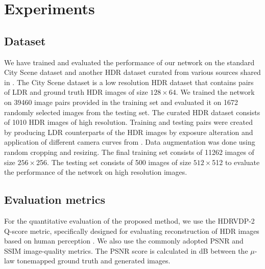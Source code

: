 \documentclass[conference]{IEEEtran}
\begin{document}
\section{Experiments}

\subsection{Dataset}

We have trained and evaluated the performance of our network on the standard City Scene dataset \cite{zhang2017learning} and another HDR dataset curated from various sources shared in \cite{eilertsen2017hdr}.
The City Scene dataset is a low resolution HDR dataset that contains pairs of LDR and ground truth HDR images of size $128 \times 64$. We trained the network on 39460 image pairs provided in the training set and evaluated it on 1672 randomly selected images from the testing set. The curated HDR dataset consists of 1010 HDR images of high resolution.
Training and testing pairs were created by producing LDR counterparts of the HDR images by exposure alteration and application of different camera curves from \cite{1211522}. Data augmentation was done using random cropping and resizing. The final training set consists of 11262 images of size $256 \times $256. The testing set consists of 500 images of size $512 \times $512 to evaluate the performance of the network on high resolution images.

\subsection{Evaluation metrics}
For the quantitative evaluation of the proposed method, we use the HDRVDP-2 Q-score metric, specifically designed for evaluating reconstruction of HDR images based on human perception \cite{narwaria2015hdr}. We also use the commonly adopted PSNR and SSIM image-quality metrics. The PSNR score is calculated in dB between the $\mu$-law tonemapped ground truth and generated images.
\end{document}
